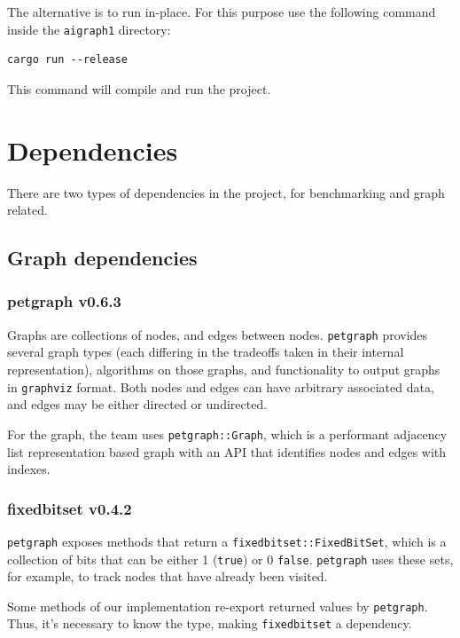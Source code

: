 The alternative is to run in-place. For this purpose use the following command inside the \texttt{aigraph1} directory:

\begin{verbatim}
cargo run --release
\end{verbatim}

This command will compile and run the project.


\newpage
\section{Dependencies}

There are two types of dependencies in the project, for benchmarking and graph related.

\subsection{Graph dependencies}

\subsubsection{petgraph v0.6.3}

Graphs are collections of nodes, and edges between nodes. \texttt{petgraph} provides several graph types 
(each differing in the tradeoffs taken in their internal representation), algorithms on those graphs, 
and functionality to output graphs in \texttt{graphviz} format. Both nodes and edges can have arbitrary associated data, 
and edges may be either directed or undirected. \autocite{petgraph}

For the graph, the team uses \texttt{petgraph::Graph}, which is a performant adjacency list representation based graph
with an API that identifies nodes and edges with indexes.

\subsubsection{fixedbitset v0.4.2}

\texttt{petgraph} exposes methods that return a \texttt{fixedbitset::FixedBitSet}, which is a collection of bits that can be either 1 (\texttt{true})
or 0 \texttt{false}. \texttt{petgraph} uses these sets, for example, to track nodes that have already been visited.

Some methods of our implementation re-export returned values by \texttt{petgraph}. Thus, it's necessary to know the type, making
\texttt{fixedbitset} a dependency. \autocite{fixedbitset}

